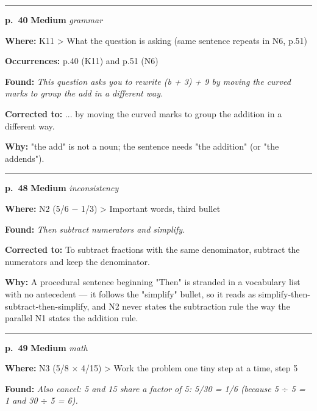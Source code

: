 \documentclass[11pt]{article}
\newcommand{\sevmed}[1]{\textcolor{orange!80!black}{\textbf{#1}}}
\begin{document}
\noindent\rule{\textwidth}{0.4pt}\par\nobreak\vspace{2pt}
\noindent\textbf{p.~40} \quad \sevmed{Medium} \quad \textit{grammar}\par
\noindent\textbf{Where: }K11 > What the question is asking (same sentence repeats in N6, p.51)\par
\noindent\textbf{Occurrences: }p.40 (K11) and p.51 (N6)\par
\noindent\textbf{Found: }\textit{This question asks you to rewrite (b + 3) + 9 by moving the curved marks to group the add in a different way.}\par
\noindent\textbf{Corrected to: }... by moving the curved marks to group the addition in a different way.\par
\noindent\textbf{Why: }"the add" is not a noun; the sentence needs "the addition" (or "the addends").\par\vspace{4pt}
\noindent\rule{\textwidth}{0.4pt}\par\nobreak\vspace{2pt}
\noindent\textbf{p.~48} \quad \sevmed{Medium} \quad \textit{inconsistency}\par
\noindent\textbf{Where: }N2 (5/6 $-$ 1/3) > Important words, third bullet\par
\noindent\textbf{Found: }\textit{Then subtract numerators and simplify.}\par
\noindent\textbf{Corrected to: }To subtract fractions with the same denominator, subtract the numerators and keep the denominator.\par
\noindent\textbf{Why: }A procedural sentence beginning "Then" is stranded in a vocabulary list with no antecedent --- it follows the "simplify" bullet, so it reads as simplify-then-subtract-then-simplify, and N2 never states the subtraction rule the way the parallel N1 states the addition rule.\par\vspace{4pt}
\noindent\rule{\textwidth}{0.4pt}\par\nobreak\vspace{2pt}
\noindent\textbf{p.~49} \quad \sevmed{Medium} \quad \textit{math}\par
\noindent\textbf{Where: }N3 (5/8 $\times$ 4/15) > Work the problem one tiny step at a time, step 5\par
\noindent\textbf{Found: }\textit{Also cancel: 5 and 15 share a factor of 5: 5/30 = 1/6 (because 5 $\div$ 5 = 1 and 30 $\div$ 5 = 6).}\par
\end{document}
